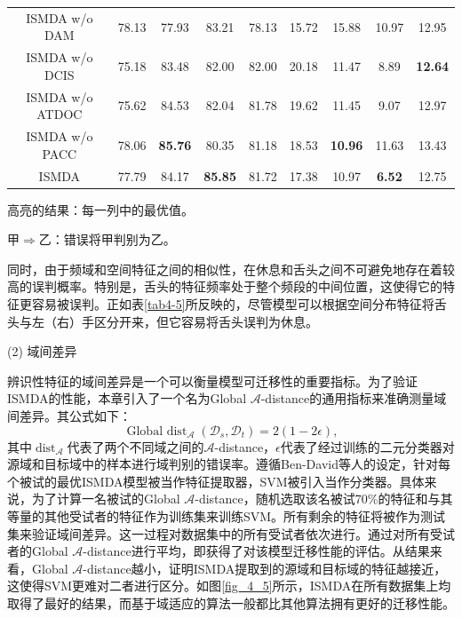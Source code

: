 \begin{table}[!t]
{\begin{threeparttable}
{\begin{tabular}{ccccccccc}
        \midrule
        ISMDA w/o DAM              & 78.13 & 	77.93          & 83.21           & 78.13 & 15.72 & 15.88 & 10.97  & 12.95 \\
        ISMDA w/o DCIS             & 75.18          & 	83.48          & 82.00           & 82.00 & 20.18          & 11.47          & 8.89  & \textbf{12.64} \\
        ISMDA w/o ATDOC            & 75.62          & 84.53              & 82.04           & 81.78 & 19.62          & 11.45          & 9.07  & 12.97 \\
        ISMDA w/o PACC             & 78.06          & 	\textbf{85.76} & 80.35           & 81.18 & 18.53          & \textbf{10.96} & 11.63 & 13.43 \\
        ISMDA                      & 77.79          & 	         84.17 & \textbf{85.85}  & 81.72 & 17.38          & 10.97          & \textbf{6.52}  & 12.75 \\
        \bottomrule
    \end{tabular}
    }
    \begin{tablenotes}
	    \footnotesize
	    \item 高亮的结果：每一列中的最优值。
	    \item 甲{$\Rightarrow$}乙：错误将甲判别为乙。
    \end{tablenotes}
\end{threeparttable}
}
\end{table}

同时，由于频域和空间特征之间的相似性，在休息和舌头之间不可避免地存在着较高的误判概率。特别是，舌头的特征频率处于整个频段的中间位置，这使得它的特征更容易被误判。正如表\ref{tab4-5}所反映的，尽管模型可以根据空间分布特征将舌头与左（右）手区分开来，但它容易将舌头误判为休息。

(2) 域间差异

辨识性特征的域间差异是一个可以衡量模型可迁移性的重要指标。为了验证ISMDA的性能，本章引入了一个名为Global $\mathcal{A}$-distance\cite{4-25}的通用指标来准确测量域间差异。其公式如下：
\begin{equation}
\label{deqn_ex14}
\operatorname{Global\ dist}_{\mathcal{A}}\left(\mathcal{D}_{s}, \mathcal{D}_{t}\right)=2\left(1-2 \epsilon\right),
\end{equation}
其中$\operatorname{dist}_{\mathcal{A}}$代表了两个不同域之间的$\mathcal{A}$-distance，$\epsilon$代表了经过训练的二元分类器对源域和目标域中的样本进行域判别的错误率。遵循Ben-David等人\cite{4-25}的设定，针对每个被试的最优ISMDA模型被当作特征提取器，SVM被引入当作分类器。具体来说，为了计算一名被试的Global $\mathcal{A}$-distance，随机选取该名被试70\%的特征和与其等量的其他受试者的特征作为训练集来训练SVM。所有剩余的特征将被作为测试集来验证域间差异。这一过程对数据集中的所有受试者依次进行。通过对所有受试者的Global $\mathcal{A}$-distance进行平均，即获得了对该模型迁移性能的评估。从结果来看，Global $\mathcal{A}$-distance越小，证明ISMDA提取到的源域和目标域的特征越接近，这使得SVM更难对二者进行区分。如图\ref{fig_4_5}所示，ISMDA在所有数据集上均取得了最好的结果，而基于域适应的算法一般都比其他算法拥有更好的迁移性能。

